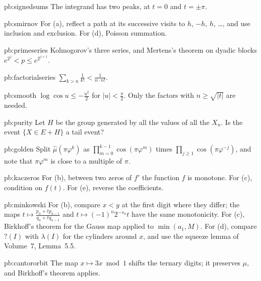 \begin{hint}{pb:signedsums}
The integrand has two peaks, at $t=0$ and $t=\pm\pi$.
\end{hint}

\begin{hint}{pb:smirnov}
For (a), reflect a path at its successive visits to $h$, $-h$, $h$, \dots, and use inclusion and exclusion. For (d), Poisson summation.
\end{hint}

\begin{hint}{pb:primeseries}
Kolmogorov's three series, and Mertens's theorem on dyadic blocks $e^{2^j}<p\le e^{2^{j+1}}$.
\end{hint}

\begin{hint}{pb:factorialseries}
$\sum_{k>n}\frac1{k!}<\frac1{n\cdot n!}$.
\end{hint}

\begin{hint}{pb:smooth}
$\log\cos u\le-\frac{u^2}2$ for $|u|<\frac\pi2$. Only the factors with $n\ge\sqrt{|t|}$ are needed.
\end{hint}

\begin{hint}{pb:purity}
Let $H$ be the group generated by all the values of all the $X_n$. Is the event $\{X\in E+H\}$ a tail event?
\end{hint}

\begin{hint}{pb:golden}
Split $\hat\mu(\pi\varphi^k)$ as $\prod_{m=0}^{k-1}\cos(\pi\varphi^m)$ times $\prod_{j\ge1}\cos(\pi\varphi^{-j})$, and note that $\pi\varphi^m$ is close to a multiple of $\pi$.
\end{hint}

\begin{hint}{pb:kaczeros}
For (b), between two zeros of $f'$ the function $f$ is monotone. For (c), condition on $f(t)$. For (e), reverse the coefficients.
\end{hint}

\begin{hint}{pb:minkowski}
For (b), compare $x<y$ at the first digit where they differ; the maps $t\mapsto\frac{p_n+tp_{n-1}}{q_n+tq_{n-1}}$ and $t\mapsto(-1)^n2^{-s_n}t$ have the same
monotonicity. For (c), Birkhoff's theorem for the Gauss map applied to $\min(a_1,M)$. For (d), compare $?(I)$ with $\lambda(I)$ for the cylinders around
$x$, and use the squeeze lemma of Volume~7, Lemma~5.5.
\end{hint}
\begin{hint}{pb:cantororbit}
The map $x\mapsto3x\bmod1$ shifts the ternary digits; it preserves $\mu$, and Birkhoff's theorem applies.
\end{hint}

